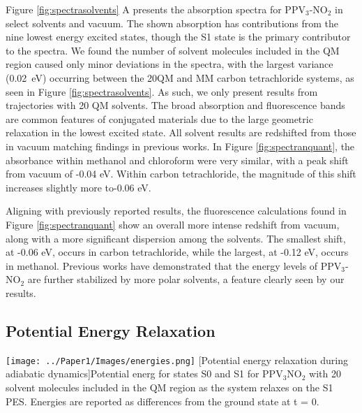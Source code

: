 Figure \ref{fig:spectrasolvents} A presents the absorption spectra for PPV\(_3\)-NO\(_2\) in select solvents and vacuum.
The shown absorption has contributions from the nine lowest energy excited states, though the S1 state is the primary contributor to the spectra.
We found the number of solvent molecules included in the QM region caused only minor deviations in the spectra, with the largest variance (0.02~eV) occurring between the 20QM and MM carbon tetrachloride systems, as seen in Figure \ref{fig:spectrasolvents}. As such, we only present results from trajectories with 20 QM solvents.
The broad absorption and fluorescence bands are common features of conjugated materials due to the large geometric relaxation in the lowest excited state. \cite{bredas2009molecular}
All solvent results are redshifted from those in vacuum matching findings in previous works.\cite{Park2013}
In Figure \ref{fig:spectranquant}, the absorbance within methanol and chloroform were very similar, with a peak shift from vacuum of -0.04 eV.
Within carbon tetrachloride, the magnitude of this shift increases slightly more to-0.06 eV. 

Aligning with previously reported results, the fluorescence calculations found in Figure \ref{fig:spectranquant} show an overall more intense redshift from vacuum, along with a more significant dispersion among the solvents. \cite{Park2013}
The smallest shift, at -0.06 eV, occurs in carbon tetrachloride, while the largest, at -0.12 eV, occurs in methanol.
Previous works have demonstrated that the energy levels of PPV\(_3\)-NO\(_2\) are further stabilized by more polar solvents, a feature clearly seen by our results.\cite{Park2013,woo2005solvent}

\subsection{Potential Energy Relaxation}

\noindent
\begin{minipage}[c]{\textwidth}
  \centering
  \texttt{[image: ../Paper1/Images/energies.png]}
  [Potential energy relaxation during adiabatic dynamics]{Potential energ for states S0 and S1 for PPV\(_3\)NO\(_2\) with 20 solvent molecules included in the QM region as the system relaxes on the S1 PES. Energies are reported as differences from the ground state at t = 0.}
  \label{fig:energiesAdiabatic}
\end{minipage}\bigskip

